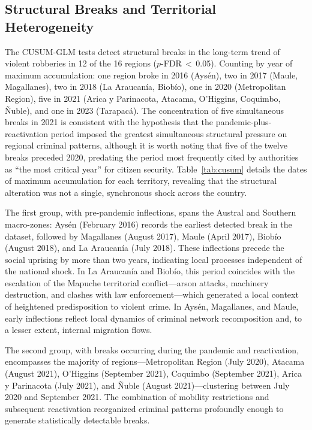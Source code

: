 \documentclass[pdflatex,sn-basic]{sn-jnl}
\begin{document}
\subsection{Structural Breaks and Territorial Heterogeneity}
\label{sub:regional}

The CUSUM-GLM tests detect structural breaks in the long-term trend of violent robberies in 12 of the 16 regions ($p$-FDR\,$<$\,0.05). Counting by year of maximum accumulation: one region broke in 2016 (Ays\'en), two in 2017 (Maule, Magallanes), two in 2018 (La Araucan\'ia, Biob\'io), one in 2020 (Metropolitan Region), five in 2021 (Arica y Parinacota, Atacama, O'Higgins, Coquimbo, \~Nuble), and one in 2023 (Tarapac\'a). The concentration of five simultaneous breaks in 2021 is consistent with the hypothesis that the pandemic-plus-reactivation period imposed the greatest simultaneous structural pressure on regional criminal patterns, although it is worth noting that five of the twelve breaks preceded 2020, predating the period most frequently cited by authorities as ``the most critical year'' for citizen security. Table~\ref{tab:cusum} details the dates of maximum accumulation for each territory, revealing that the structural alteration was not a single, synchronous shock across the country. 

The first group, with pre-pandemic inflections, spans the Austral and Southern macro-zones: Ays\'en (February 2016) records the earliest detected break in the dataset, followed by Magallanes (August 2017), Maule (April 2017), Biob\'io (August 2018), and La Araucan\'ia (July 2018). These inflections precede the social uprising by more than two years, indicating local processes independent of the national shock. In La Araucan\'ia and Biob\'io, this period coincides with the escalation of the Mapuche territorial conflict---arson attacks, machinery destruction, and clashes with law enforcement---which generated a local context of heightened predisposition to violent crime. In Ays\'en, Magallanes, and Maule, early inflections reflect local dynamics of criminal network recomposition and, to a lesser extent, internal migration flows. 

The second group, with breaks occurring during the pandemic and reactivation, encompasses the majority of regions---Metropolitan Region (July 2020), Atacama (August 2021), O'Higgins (September 2021), Coquimbo (September 2021), Arica y Parinacota (July 2021), and \~Nuble (August 2021)---clustering between July 2020 and September 2021. The combination of mobility restrictions and subsequent reactivation reorganized criminal patterns profoundly enough to generate statistically detectable breaks. 
\end{document}
